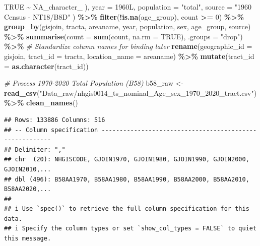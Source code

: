 \documentclass[
]{article}
\newenvironment{Shaded}{\begin{snugshade}}{\end{snugshade}}
\newcommand{\AttributeTok}[1]{\textcolor[rgb]{0.13,0.29,0.53}{#1}}
\newcommand{\CommentTok}[1]{\textcolor[rgb]{0.56,0.35,0.01}{\textit{#1}}}
\newcommand{\ConstantTok}[1]{\textcolor[rgb]{0.56,0.35,0.01}{#1}}
\newcommand{\DataTypeTok}[1]{\textcolor[rgb]{0.13,0.29,0.53}{#1}}
\newcommand{\DecValTok}[1]{\textcolor[rgb]{0.00,0.00,0.81}{#1}}
\newcommand{\FunctionTok}[1]{\textcolor[rgb]{0.13,0.29,0.53}{\textbf{#1}}}
\newcommand{\NormalTok}[1]{#1}
\newcommand{\OtherTok}[1]{\textcolor[rgb]{0.56,0.35,0.01}{#1}}
\newcommand{\SpecialCharTok}[1]{\textcolor[rgb]{0.81,0.36,0.00}{\textbf{#1}}}
\newcommand{\StringTok}[1]{\textcolor[rgb]{0.31,0.60,0.02}{#1}}
\begin{document}
\begin{Shaded}
\begin{Highlighting}[]
      \ConstantTok{TRUE} \SpecialCharTok{\textasciitilde{}} \ConstantTok{NA\_character\_}
\NormalTok{    ),}
    \AttributeTok{year =} \DecValTok{1960}\DataTypeTok{L}\NormalTok{,}
    \AttributeTok{population =} \StringTok{"total"}\NormalTok{,}
    \AttributeTok{source =} \StringTok{"1960 Census {-} NT18/B8D"}
\NormalTok{  ) }\SpecialCharTok{\%\textgreater{}\%}
  \FunctionTok{filter}\NormalTok{(}\SpecialCharTok{!}\FunctionTok{is.na}\NormalTok{(age\_group), count }\SpecialCharTok{\textgreater{}=} \DecValTok{0}\NormalTok{) }\SpecialCharTok{\%\textgreater{}\%}
  \FunctionTok{group\_by}\NormalTok{(gisjoin, tracta, areaname, year, population, sex, age\_group, source) }\SpecialCharTok{\%\textgreater{}\%}
  \FunctionTok{summarise}\NormalTok{(}\AttributeTok{count =} \FunctionTok{sum}\NormalTok{(count, }\AttributeTok{na.rm =} \ConstantTok{TRUE}\NormalTok{), }\AttributeTok{.groups =} \StringTok{"drop"}\NormalTok{) }\SpecialCharTok{\%\textgreater{}\%}
  \CommentTok{\# Standardize column names for binding later}
  \FunctionTok{rename}\NormalTok{(}\AttributeTok{geographic\_id =}\NormalTok{ gisjoin, }\AttributeTok{tract\_id =}\NormalTok{ tracta, }\AttributeTok{location\_name =}\NormalTok{ areaname) }\SpecialCharTok{\%\textgreater{}\%}
  \FunctionTok{mutate}\NormalTok{(}\AttributeTok{tract\_id =} \FunctionTok{as.character}\NormalTok{(tract\_id))}

\CommentTok{\# Process 1970{-}2020 Total Population (B58)}
\NormalTok{b58\_raw }\OtherTok{\textless{}{-}} \FunctionTok{read\_csv}\NormalTok{(}\StringTok{"Data\_raw/nhgis0014\_ts\_nominal\_Age\_sex\_1970\_2020\_tract.csv"}\NormalTok{) }\SpecialCharTok{\%\textgreater{}\%}
  \FunctionTok{clean\_names}\NormalTok{()}
\end{Highlighting}
\end{Shaded}

\begin{verbatim}
## Rows: 133886 Columns: 516
## -- Column specification --------------------------------------------------------
## Delimiter: ","
## chr  (20): NHGISCODE, GJOIN1970, GJOIN1980, GJOIN1990, GJOIN2000, GJOIN2010,...
## dbl (496): B58AA1970, B58AA1980, B58AA1990, B58AA2000, B58AA2010, B58AA2020,...
## 
## i Use `spec()` to retrieve the full column specification for this data.
## i Specify the column types or set `show_col_types = FALSE` to quiet this message.
\end{verbatim}
\end{document}
